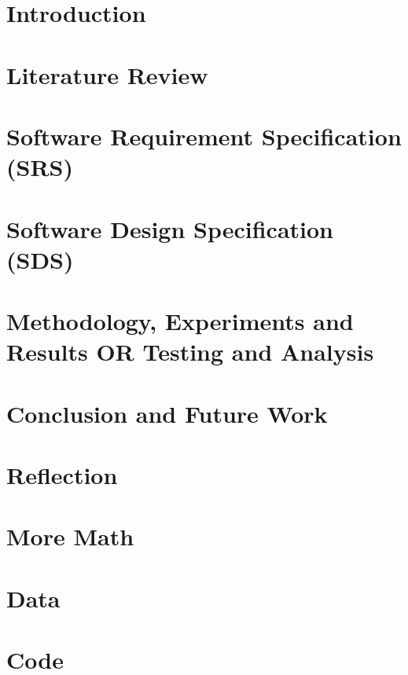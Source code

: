 \documentclass[12pt,twosided]{report}
\begin{document}
\chapter{Introduction}
\label{chap:intro}


\chapter{Literature Review}
\label{chap:lit}


\chapter{Software Requirement Specification (SRS)}
\label{chap:srs}


\chapter{Software Design Specification (SDS)}
\label{chap:sds}


\chapter{Methodology, Experiments and Results OR Testing and Analysis}
\label{chap:results}


\chapter{Conclusion and Future Work}
\label{chap:outro}


\chapter{Reflection}
\label{chap:Reflection}


\begin{appendices}

  
\chapter{More Math}


\chapter{Data}


\chapter{Code}

\end{appendices}

\printbibliography[heading=bibintoc,title={References}]
\end{document}
